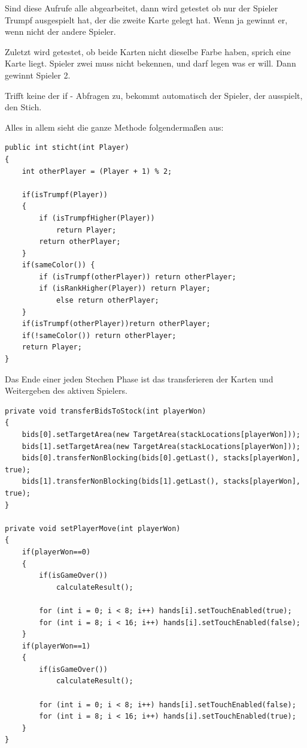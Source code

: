 Sind diese Aufrufe alle abgearbeitet, dann wird getestet ob nur der Spieler
Trumpf ausgespielt hat, der die zweite Karte gelegt hat. Wenn ja gewinnt er,
wenn nicht der andere Spieler.

Zuletzt wird getestet, ob beide Karten nicht dieselbe Farbe haben, sprich eine
Karte liegt. Spieler zwei muss nicht bekennen, und darf legen was er will. Dann
gewinnt Spieler 2.

Trifft keine der if - Abfragen zu, bekommt automatisch der Spieler, der
ausspielt, den Stich.

Alles in allem sieht die ganze Methode folgendermaßen aus:

\begin{lstlisting}[caption={sticht() Methode},captionpos=b]
public int sticht(int Player)
{
    int otherPlayer = (Player + 1) % 2;

    if(isTrumpf(Player))
    {
        if (isTrumpfHigher(Player))
            return Player;
        return otherPlayer;
    }
    if(sameColor()) {
        if (isTrumpf(otherPlayer)) return otherPlayer;
        if (isRankHigher(Player)) return Player;
            else return otherPlayer;
    }
    if(isTrumpf(otherPlayer))return otherPlayer;
    if(!sameColor()) return otherPlayer;
    return Player;
}
\end{lstlisting}

Das Ende einer jeden Stechen Phase ist das transferieren der Karten und
Weitergeben des aktiven Spielers.

\begin{lstlisting}[caption={TransferBidsToStock und setPlayerMove},captionpos=b]
private void transferBidsToStock(int playerWon)
{
    bids[0].setTargetArea(new TargetArea(stackLocations[playerWon]));
    bids[1].setTargetArea(new TargetArea(stackLocations[playerWon]));
    bids[0].transferNonBlocking(bids[0].getLast(), stacks[playerWon], true);
    bids[1].transferNonBlocking(bids[1].getLast(), stacks[playerWon], true);
}

private void setPlayerMove(int playerWon)
{
    if(playerWon==0)
    {
        if(isGameOver())
            calculateResult();

        for (int i = 0; i < 8; i++) hands[i].setTouchEnabled(true);
        for (int i = 8; i < 16; i++) hands[i].setTouchEnabled(false);
    }
    if(playerWon==1)
    {
        if(isGameOver())
            calculateResult();

        for (int i = 0; i < 8; i++) hands[i].setTouchEnabled(false);
        for (int i = 8; i < 16; i++) hands[i].setTouchEnabled(true);
    }
}
\end{lstlisting}


